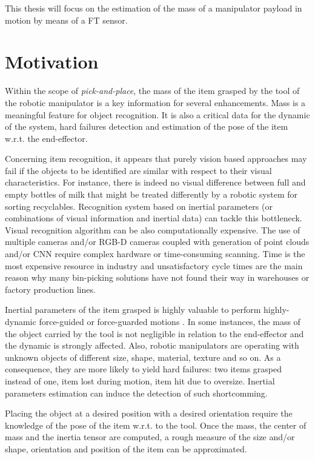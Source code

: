 \documentclass[/home/francois/latex/report/main.tex]{subfiles}
\begin{document}
This thesis will focus on the estimation of the mass of a manipulator payload in motion by means of a \ac{FT} sensor.

\section{Motivation}

Within the scope of \textit{pick-and-place}, the mass of the item grasped by the tool of the robotic manipulator is a key information for several enhancements. Mass is a meaningful feature for object recognition. It is also a critical data for the dynamic of the system, hard failures detection and estimation of the pose of the item w.r.t. the end-effector.

Concerning item recognition, it appears that purely vision based approaches may fail if the objects to be identified are similar with respect to their visual characteristics. For instance, there is indeed no visual difference between full and empty bottles of milk that might be treated differently by a robotic system for sorting recyclables. Recognition system based on inertial parameters (or combinations of visual information and inertial data) can tackle this bottleneck.
Visual recognition algorithm can be also computationally expensive. The use of multiple cameras and/or RGB-D cameras coupled with generation of point clouds and/or \ac{CNN} require complex hardware or time-consuming scanning. Time is the most expensive resource in industry and unsatisfactory cycle times are the main reason why many bin-picking solutions have not found their way in warehouses or factory production lines.

Inertial parameters of the item grasped is highly valuable to perform highly-dynamic force-guided or force-guarded motions \cite{Garcia2006, KubusKroger2008}. In some instances, the mass of the object carried by the tool is not negligible in relation to the end-effector and the dynamic is strongly affected.
Also, robotic manipulators are operating with unknown objects of different size, shape, material, texture and so on. As a consequence, they are more likely to yield hard failures: two items grasped instead of one, item lost during motion, item hit due to oversize. Inertial parameters estimation can induce the detection of such shortcomming.

Placing the object at a desired position with a desired orientation require the knowledge of the pose of the item w.r.t. to the tool. Once the mass, the center of mass and the inertia tensor are computed, a rough measure of the size and/or shape, orientation and position of the item can be approximated.
\end{document}
